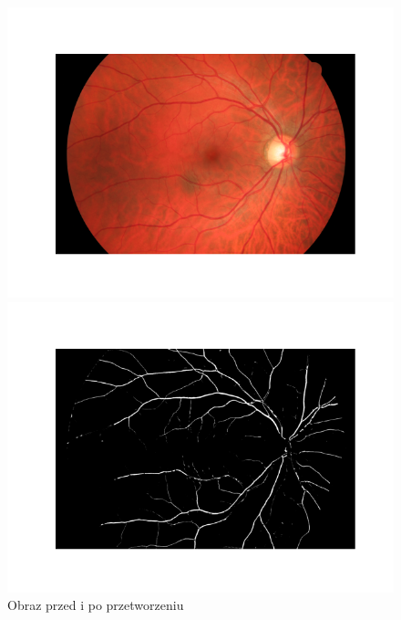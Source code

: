 \documentclass{article}
\begin{document}
\begin{enumerate}
\begin{enumerate}
\begin{enumerate}
\begin{figure}[h]
\begin{minipage}{0.47\textwidth}
                                      \includegraphics[width=\linewidth]{../res/sample-original-image.png}
                                  \end{minipage}
                                  \begin{minipage}{0.47\textwidth}
                                      \centering
                                      \includegraphics[width=\linewidth]{../res/sample-preprocessed-image.png}
                                  \end{minipage}
                                  \caption{Obraz przed i po przetworzeniu}
                              \end{figure}
                              \newpage

\end{enumerate}
\end{enumerate}
\end{enumerate}
\end{document}
